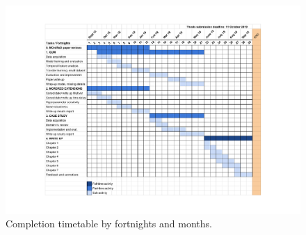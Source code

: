 \documentclass[pdftex,12pt,a4paper]{article}
\theoremstyle{definition}
\theoremstyle{remark}
\begin{document}
\begin{figure}
    \centerline{\includegraphics[width=21cm]{CompletionPlan.pdf}}
    \caption{Completion timetable by fortnights and months.}
	\label{fig:timetable}
\end{figure}
\end{document}
